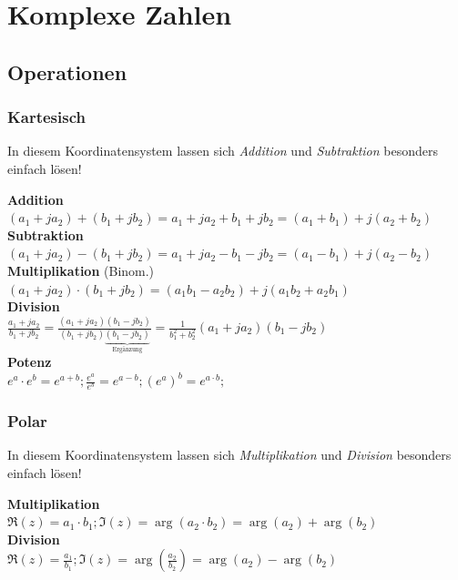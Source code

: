 \section{Komplexe Zahlen}
\subsection{Operationen}
\subsubsection{Kartesisch}
In diesem Koordinatensystem lassen sich \textit{Addition} und \textit{Subtraktion} besonders einfach lösen!

\noindent\textbf{Addition}\\
$(a_1 + ja_2) + (b_1 + jb_2) = a_1 + ja_2 + b_1 + jb_2 = (a_1 + b_1) + j(a_2 + b_2)$\\
\noindent\textbf{Subtraktion}\\
$(a_1 + ja_2) - (b_1 + jb_2) = a_1 + ja_2 - b_1 - jb_2 = (a_1 - b_1) + j(a_2 - b_2)$\\
\noindent\textbf{Multiplikation} (Binom.)\\
$(a_1 + ja_2) \cdot (b_1 + jb_2) = (a_1b_1 - a_2b_2) + j(a_1b_2 + a_2b_1)$\\
\noindent\textbf{Division}\\
$\frac{a_1 + ja_2}{b_1 + jb_2} = \frac{(a_1 + ja_2)(b_1 - jb_2)}{(b_1 + jb_2)\underbrace{(b_1 - jb_2)}_{\text{Ergänzung}}} = \frac{1}{b_1^2 + b_2^2}(a_1+ja_2)(b_1 - jb_2)$\\
\noindent\textbf{Potenz}\\
$e^a\cdot e^b = e^{a+b}; \frac{e^a}{e^b} = e^{a-b}; (e^a)^b = e^{a\cdot b}; $


\subsubsection{Polar}
In diesem Koordinatensystem lassen sich \textit{Multiplikation} und \textit{Division} besonders einfach lösen!

\noindent\textbf{Multiplikation}\\
$\Re(z) = a_1 \cdot b_1; \Im(z) = \arg(a_2 \cdot b_2) = \arg(a_2) + \arg(b_2)$\\

\noindent\textbf{Division}\\
$\Re(z) = \frac{a_1}{b_1}; \Im(z) = \arg(\frac{a_2}{b_2}) = \arg(a_2) - \arg(b_2)$\\


